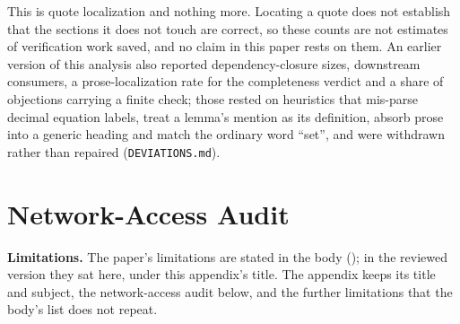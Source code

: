 This is quote localization and nothing more. Locating a quote does not establish that the sections it does not touch are correct, so these counts are not estimates of verification work saved, and no claim in this paper rests on them. An earlier version of this analysis also reported dependency-closure sizes, downstream consumers, a prose-localization rate for the completeness verdict and a share of objections carrying a finite check; those rested on heuristics that mis-parse decimal equation labels, treat a lemma's mention as its definition, absorb prose into a generic heading and match the ordinary word ``set'', and were withdrawn rather than repaired (\texttt{DEVIATIONS.md}).
\begin{table}[htbp]\centering\footnotesize
\caption{Where each rule's evidence points, by population: how many texts receive at least one anchored quote, and the median number of distinct sections those quotes fall in among the texts that receive one.}
\label{tab:cost}
\COSTTABLE
\end{table}

\section{Network-Access Audit}
\label{app:network}
\textbf{Limitations.} The paper's limitations are stated in the body (); in the reviewed version they sat here, under this appendix's title. The appendix keeps its title and subject, the network-access audit below, and the further limitations that the body's list does not repeat.

